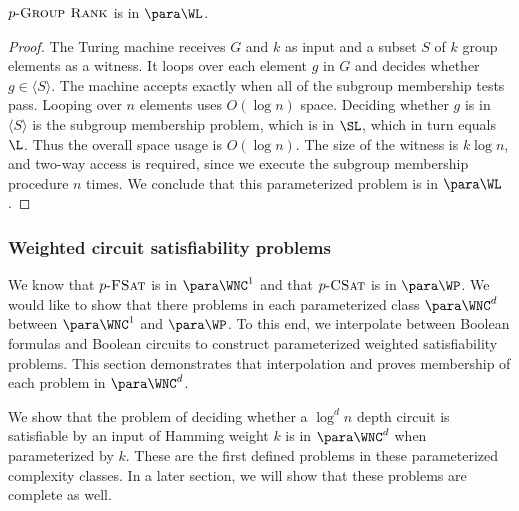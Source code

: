 \begin{theorem}\label{thm:pgrouprank}
  $p\textnormal{-}\textsc{Group Rank}$ is in $\para \WL$.
\end{theorem}
\begin{proof}
  The Turing machine receives $G$ and $k$ as input and a subset $S$ of $k$ group elements as a witness.
  It loops over each element $g$ in $G$ and decides whether $g \in \langle{S}\rangle$.
  The machine accepts exactly when all of the subgroup membership tests pass.
  Looping over $n$ elements uses $O(\log n)$ space.
  Deciding whether $g$ is in $\langle{S}\rangle$ is the subgroup membership problem, which is in $\SL$, which in turn equals $\L$.
  Thus the overall space usage is $O(\log n)$.
  The size of the witness is $k \log n$, and two-way access is required, since we execute the subgroup membership procedure $n$ times.
  We conclude that this parameterized problem is in $\para \WL$.
\end{proof}


\subsubsection{Weighted circuit satisfiability problems}

%
%
%
We know that $p \textnormal{-} \textsc{FSat}$ is in $\para \WNC^1$ and that $p \textnormal{-} \textsc{CSat}$ is in $\para \WP$.
%
%
%
We would like to show that there problems in each parameterized class $\para \WNC^d$ between $\para \WNC^1$ and $\para \WP$.
%
%
%
To this end, we interpolate between Boolean formulas and Boolean circuits to construct parameterized weighted satisfiability problems.
%
%
%
This section demonstrates that interpolation and proves membership of each problem in $\para \WNC^d$.

%
%
%
%
We show that the problem of deciding whether a $\log^d n$ depth circuit is satisfiable by an input of Hamming weight $k$ is in $\para \WNC^d$ when parameterized by $k$.
%
%
%
These are the first defined problems in these parameterized complexity classes.
%
%
In a later section, we will show that these problems are complete as well.

